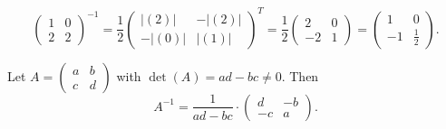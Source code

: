 \begin{example}
\[
\left ( \begin{array}{cc} 1 & 0 \\ 2 & 2 \end{array} \right )^{-1}
= \frac{1}{2} \left ( \begin{array}{cc}
|(2)| & -|(2)| \\ -|(0)| & |(1)|
\end{array} \right )^T
= \frac{1}{2} \left ( \begin{array}{cc} 2 & 0 \\ -2 & 1 \end{array} \right )
= \left ( \begin{array}{cc} 1 & 0 \\ -1 & \tfrac12 \end{array} \right ).
\]
\end{example}

\begin{fact}
Let $A= \left ( \begin{smallmatrix} a & b \\ c & d \end{smallmatrix} \right )$ with
$\det(A) = ad-bc \neq 0$. Then
\[
A^{-1} = \frac{1}{ad-bc}\cdot \left( \begin{array}{cc} d & -b \\ -c & a \end{array} \right ).
\]
\end{fact}
